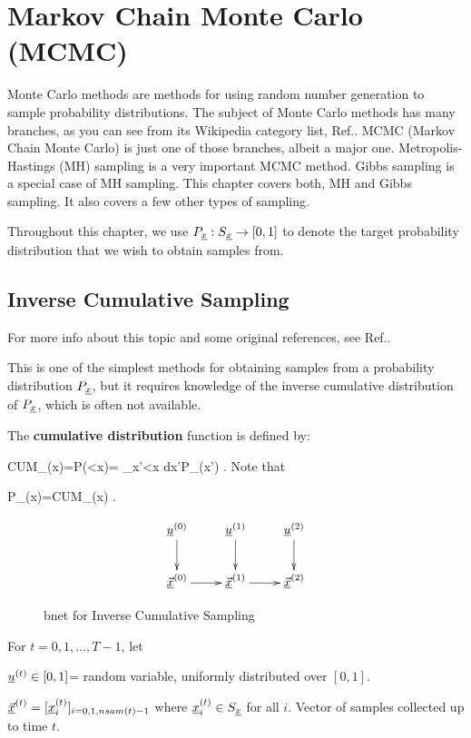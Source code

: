 \chapter{Markov Chain Monte Carlo (MCMC)}


Monte Carlo methods
are methods for using
 random number generation to
sample probability distributions.
The subject of Monte Carlo methods
has many branches, as you can see 
from its Wikipedia
category list, Ref.\cite{wiki-monte-carlo}.
MCMC (Markov
Chain Monte Carlo) is just one of those
branches, albeit a major one.
Metropolis-Hastings (MH) sampling
is a very important MCMC method.
Gibbs sampling is
a special case
of MH sampling.
This chapter covers both, MH and Gibbs sampling.
It also covers a few 
other types of sampling.

Throughout this chapter,
we use $P_{\underline{x}}:S_{\underline{x}}\rightarrow [0,1]$
to denote the target probability
distribution
that we wish to obtain samples from.


\section*{Inverse Cumulative Sampling}
For more info about this topic 
and some original references, 
see Ref.\cite{wiki-inv-cum}.

This
is one of the simplest
methods for obtaining
samples from a probability 
distribution $P_{\underline{x}}$,
but it
requires knowledge
of the inverse
 cumulative distribution
of $P_{\underline{x}}$, which
is often not available.

The {\bf cumulative
distribution} function
is defined by:

\beq
CUM_\rvx(x)=P(\rvx<x)=
\int_{x'<x} dx'\;P_\rvx(x')
\;.
\eeq
Note that

\beq
P_\rvx(x)=CUM_\rvx(x)
\;.
\eeq


\begin{figure}[h!]
$$\xymatrix{
\rvu^{(0)}\ar[d]
&\rvu^{(1)}\ar[d]
&\rvu^{(2)}\ar[d]
\\
\ul{\vecx}^{(0)}\ar[r]
&\ul{\vecx}^{(1)}\ar[r]
&\ul{\vecx}^{(2)}
}$$
\caption{bnet for Inverse Cumulative Sampling}
\label{fig-mcmc-inverse-bnet}
\end{figure}

For $t=0, 1, \ldots, T-1$, let

${\underline{u}}^{(t)}\in [0,1]$= random variable, 
uniformly
distributed over $[0,1]$.

$\underline{{\vec{x}}}^{(t)}=[{\underline{x}}^{(t)}_i]_{i=0,1, nsam(t)-1}$
where ${\underline{x}}^{(t)}_i \in S_{\underline{x}}$ for all $i$. 
Vector of samples collected 
up to time $t$.

